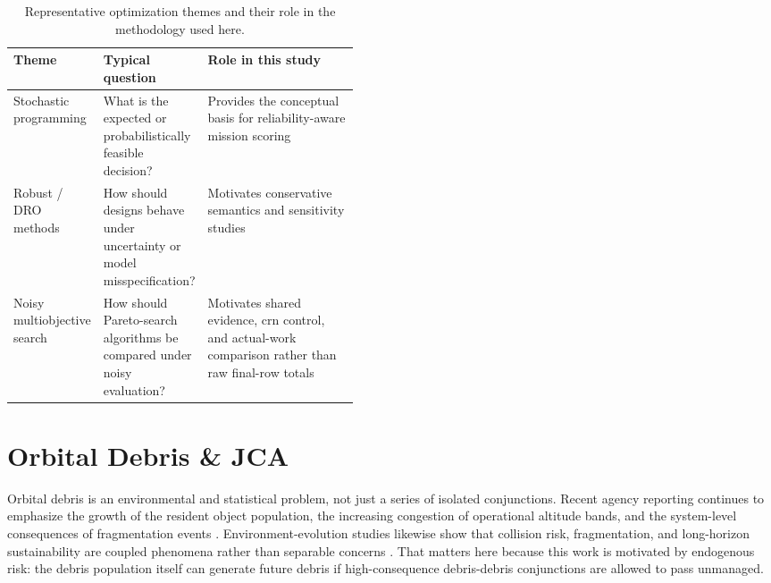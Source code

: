 \begin{table}[htb]
    \centering
    \caption[Optimization-literature themes]{Representative optimization themes and their role in the methodology used here.}
    \label{tab:lit_optimization_themes}
    \begin{tabularx}{0.92\linewidth}{@{}L{0.22\linewidth}L{0.23\linewidth}Y@{}}
        \toprule
        Theme & Typical question & Role in this study \\
        \midrule
        Stochastic programming & What is the expected or probabilistically feasible decision? & Provides the conceptual basis for reliability-aware mission scoring \\
        Robust / DRO methods & How should designs behave under uncertainty or model misspecification? & Motivates conservative semantics and sensitivity studies \\
        Noisy multiobjective search & How should Pareto-search algorithms be compared under noisy evaluation? & Motivates shared evidence, \gls{crn} control, and actual-work comparison rather than raw final-row totals \\
        \bottomrule
    \end{tabularx}
\end{table}

\section{Orbital Debris \& JCA} \label{se:debrisjca}
Orbital debris is an environmental and statistical problem, not just a series of isolated conjunctions. Recent agency reporting continues to emphasize the growth of the resident object population, the increasing congestion of operational altitude bands, and the system-level consequences of fragmentation events \cite{ESAEnvironment2025,Matney2025ORDEM4}. Environment-evolution studies likewise show that collision risk, fragmentation, and long-horizon sustainability are coupled phenomena rather than separable concerns \cite{Harada2024NEODEEM,Muciaccia2024LEOCapacity}. That matters here because this work is motivated by endogenous risk: the debris population itself can generate future debris if high-consequence debris-debris conjunctions are allowed to pass unmanaged.

